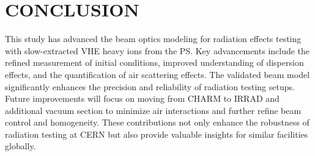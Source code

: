 \documentclass[a4paper,
               biblatex,     %
               ]{jacow}
\begin{document}










\section{CONCLUSION}

This study has advanced the beam optics modeling for radiation effects testing with slow-extracted VHE heavy ions from the PS. Key advancements include the refined measurement of initial conditions, improved understanding of dispersion effects, and the quantification of air scattering effects. The validated beam model significantly enhances the precision and reliability of radiation testing setups. Future improvements will focus on moving from CHARM to IRRAD and additional vacuum section to minimize air interactions and further refine beam control and homogeneity. These contributions not only enhance the robustness of radiation testing at CERN but also provide valuable insights for similar facilities globally.
\end{document}
